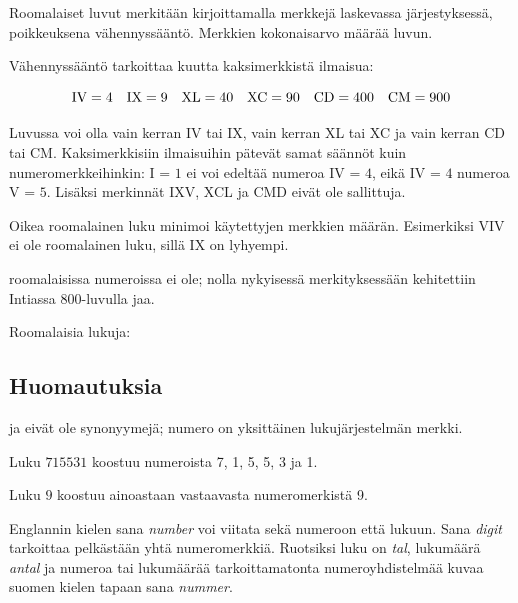 Roomalaiset luvut merkitään kirjoittamalla merkkejä laskevassa järjestyksessä, poikkeuksena vähennyssääntö. Merkkien kokonaisarvo määrää luvun.

Vähennyssääntö tarkoittaa kuutta kaksimerkkistä ilmaisua:

\begin{equation*}
	\rm IV=4\quad
	IX=9\quad
	XL=40\quad
	XC=90\quad
	CD=400\quad
	CM=900
\end{equation*}

Luvussa voi olla vain kerran IV tai IX, vain kerran XL tai XC ja vain kerran CD tai CM.
Kaksimerkkisiin ilmaisuihin pätevät samat säännöt kuin numeromerkkeihinkin: I = $1$ ei voi edeltää numeroa IV = $4$, eikä IV = $4$ numeroa V = $5$.
Lisäksi merkinnät IXV, XCL ja CMD eivät ole sallittuja.

Oikea roomalainen luku minimoi käytettyjen merkkien määrän. Esimerkiksi VIV ei ole roomalainen luku, sillä IX on lyhyempi.

 roomalaisissa numeroissa ei ole; nolla nykyisessä merkityksessään kehitettiin Intiassa 800-luvulla jaa.

\begin{esimerkki}
	Roomalaisia lukuja:
	\begin{alakohdat}
	\end{alakohdat}
\end{esimerkki}

\subsection*{Huomautuksia}

 ja  eivät ole synonyymejä; numero on yksittäinen lukujärjestelmän merkki.

\begin{esimerkki}
	Luku $715531$ koostuu numeroista 7, 1, 5, 5, 3 ja 1.
	
	Luku $9$ koostuu ainoastaan vastaavasta numeromerkistä 9.
\end{esimerkki}

Englannin kielen sana \textit{number} voi viitata sekä numeroon että lukuun.
Sana \textit{digit} tarkoittaa pelkästään yhtä numeromerkkiä.
Ruotsiksi luku on \textit{tal}, lukumäärä \textit{antal} ja numeroa tai lukumäärää tarkoittamatonta numeroyhdistelmää kuvaa suomen kielen tapaan sana \textit{nummer}.

